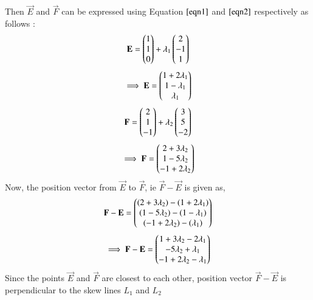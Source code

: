 \documentclass[journal,12pt,twocolumn]{IEEEtran}
\begin{document}
Then $\vec{E}$ and $\vec{F}$ can be expressed using Equation $\ref{eqn1}$ and $\ref{eqn2}$ respectively as follows :
\begin{align}
    \mathbf{E} = \begin{pmatrix}1 \\ 1 \\ 0\end{pmatrix} + \lambda_1\begin{pmatrix}2 \\ -1 \\ 1\end{pmatrix}
\end{align}
\begin{align}
    \implies \mathbf{E} = \begin{pmatrix}1+2\lambda_1 \\ 1-\lambda_1 \\ \lambda_1\end{pmatrix}
\end{align}
\begin{align}
    \mathbf{F} = \begin{pmatrix}2 \\ 1 \\ -1\end{pmatrix} + \lambda_2\begin{pmatrix}3 \\ 5 \\ -2\end{pmatrix}
\end{align}
\begin{align}
    \implies \mathbf{F} = \begin{pmatrix}2+3\lambda_2 \\ 1-5\lambda_2 \\ -1+2\lambda_2\end{pmatrix}
\end{align}
Now, the position vector from $\vec{E}$ to $\vec{F}$, ie $\vec{F}-\vec{E}$ is given as,
\begin{align}
    \mathbf{F}-\mathbf{E} = \begin{pmatrix}(2+3\lambda_2)-(1+2\lambda_1) \\ (1-5\lambda_2)-(1-\lambda_1) \\ (-1+2\lambda_2)-(\lambda_1)\end{pmatrix}
\end{align}
\begin{align}\label{e4}
    \implies\mathbf{F}-\mathbf{E} = \begin{pmatrix} 1 + 3\lambda_2 -2\lambda_1 \\ -5\lambda_2 + \lambda_1 \\ -1 + 2\lambda_2 - \lambda_1\end{pmatrix}
\end{align}
Since the points $\vec{E}$ and $\vec{F}$ are closest to each other, position vector $\vec{F}-\vec{E}$ is perpendicular to the skew lines $L_1$ and $L_2$
\end{document}
